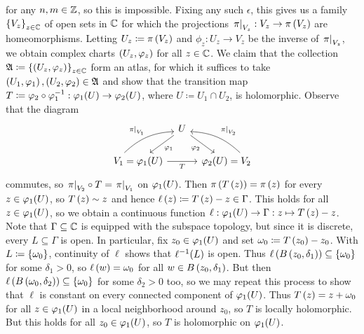 \documentclass[../Moduli_Spaces_of_Riemann_Surfaces.tex]{subfiles}
\begin{document}
\begin{example}
\begin{equation*}
        \end{equation*}
        for any $n,m\in\mathbb{Z}$, so this is impossible. Fixing any such $\epsilon$, this gives us a family $\left\{V_z\right\}_{z\in\mathbb{C}}$ of open sets in $\mathbb{C}$ for which the projections $\left.\pi\right|_{V_z}:V_z\to\pi\left(V_z\right)$ are homeomorphisms. Letting $U_z\coloneqq\pi\left(V_z\right)$ and $\phi_z:U_z\to V_z$ be the inverse of $\left.\pi\right|_{V_z}$, we obtain complex charts $\left(U_z,\varphi_z\right)$ for all $z\in\mathbb{C}$. We claim that the collection $\mathfrak{A}\coloneqq\left\{\left(U_z,\varphi_z\right)\right\}_{z\in\mathbb{C}}$ form an atlas, for which it suffices to take $\left(U_1,\varphi_1\right),\left(U_2,\varphi_2\right)\in\mathfrak{A}$ and show that the transition map $T\coloneqq\varphi_2\circ\varphi_1^{-1}:\varphi_1\!\left(U\right)\to\varphi_2\!\left(U\right)$, where $U\coloneqq U_1\cap U_2$, is holomorphic. Observe that the diagram
        \begin{equation*}
            \begin{tikzcd}[column sep=0.1in]
                & U \ar[dl, "\phi_1"] \ar[dr, "\phi_2"'] \\
                V_1=\phi_1(U) \ar[ur, "\l.\pi\r|_{V_1}", bend left=20, start anchor={[xshift=-20px]}] \ar[rr, "T"'] & & \phi_2(U)=V_2 \ar[ul, "\l.\pi\r|_{V_2}"', bend right=20, start anchor={[xshift=20px]}]
            \end{tikzcd}
        \end{equation*}
        commutes, so $\left.\pi\right|_{V_2}\circ T=\left.\pi\right|_{V_1}$ on $\varphi_1\!\left(U\right)$. Then $\pi\left(T\left(z\right)\right)=\pi\left(z\right)$ for every $z\in\varphi_1\!\left(U\right)$, so $T\left(z\right)\sim z$ and hence $\ell\left(z\right)\coloneqq T\left(z\right)-z\in\Gamma$. This holds for all $z\in\varphi_1\!\left(U\right)$, so we obtain a continuous function $\ell:\varphi_1\!\left(U\right)\to\Gamma:z\mapsto T\left(z\right)-z$. Note that $\Gamma\subseteq\mathbb{C}$ is equipped with the subspace topology, but since it is discrete, every $L\subseteq\Gamma$ is open. In particular, fix $z_0\in\varphi_1\!\left(U\right)$ and set $\omega_0\coloneqq T\left(z_0\right)-z_0$. With $L\coloneqq\left\{\omega_0\right\}$, continuity of $\ell$ shows that $\ell^{-1}\!\left(L\right)$ is open. Thus $\ell\left(B\left(z_0,\delta_1\right)\right)\subseteq\left\{\omega_0\right\}$ for some $\delta_1>0$, so $\ell\left(w\right)=\omega_0$ for all $w\in B\left(z_0,\delta_1\right)$. But then $\ell\left(B\left(\omega_0,\delta_2\right)\right)\subseteq\left\{\omega_0\right\}$ for some $\delta_2>0$ too, so we may repeat this process to show that $\ell$ is constant on every connected component of $\varphi_1\!\left(U\right)$. Thus $T\left(z\right)=z+\omega_0$ for all $z\in\varphi_1\!\left(U\right)$ in a local neighborhood around $z_0$, so $T$ is locally holomorphic. But this holds for all $z_0\in\varphi_1\!\left(U\right)$, so $T$ is holomorphic on $\varphi_1\!\left(U\right)$.\exqed
    \end{example}
\end{document}
